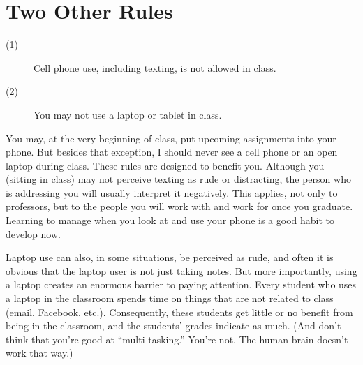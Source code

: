 \section{Two Other Rules}

\begin{description}
\item[(1)] Cell phone use, including texting, is not allowed in class. 
\item[(2)] You may not use a laptop or tablet in class. 
\end{description}

\noindent You may, at the very beginning of class, put upcoming assignments into your phone. But besides that exception, I should never see a cell phone or an open laptop during class.
These rules are designed to benefit you. Although you (sitting in class) may not perceive texting as rude or distracting, the person who is addressing you will usually interpret it negatively. This applies, not only to professors, but to the people you will work with and work for once you graduate. Learning to manage when you look at and use your phone is a good habit to develop now.

Laptop use can also, in some situations, be perceived as rude, and often it is obvious that the laptop user is not just taking notes. But more importantly, using a laptop creates an enormous barrier to paying attention. Every student who uses a laptop in the classroom spends time on things that are not related to class (email, Facebook, etc.). Consequently, these students get little or no benefit from being in the classroom, and the students’ grades indicate as much. (And don’t think that you’re good at ``multi-tasking.'' You’re not. The human brain doesn’t work that way.)
